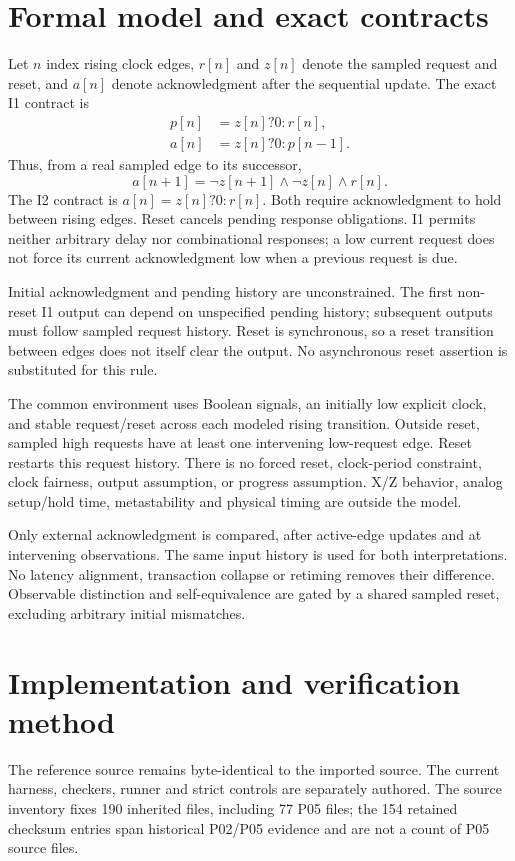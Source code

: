 \documentclass[11pt,a4paper]{article}
\begin{document}
\section{Formal model and exact contracts}
Let $n$ index rising clock edges, $r[n]$ and $z[n]$ denote the sampled request and reset, and $a[n]$ denote acknowledgment after the sequential update. The exact I1 contract is
\begin{align}
p[n]&=z[n] ? 0 : r[n],\\
a[n]&=z[n] ? 0 : p[n-1].
\end{align}
Thus, from a real sampled edge to its successor,
\begin{equation}
a[n+1]=\neg z[n+1]\land\neg z[n]\land r[n].
\end{equation}
The I2 contract is $a[n]=z[n] ? 0 : r[n]$. Both require acknowledgment to hold between rising edges. Reset cancels pending response obligations. I1 permits neither arbitrary delay nor combinational responses; a low current request does not force its current acknowledgment low when a previous request is due.

Initial acknowledgment and pending history are unconstrained. The first non-reset I1 output can depend on unspecified pending history; subsequent outputs must follow sampled request history. Reset is synchronous, so a reset transition between edges does not itself clear the output. No asynchronous reset assertion is substituted for this rule.

The common environment uses Boolean signals, an initially low explicit clock, and stable request/reset across each modeled rising transition. Outside reset, sampled high requests have at least one intervening low-request edge. Reset restarts this request history. There is no forced reset, clock-period constraint, clock fairness, output assumption, or progress assumption. X/Z behavior, analog setup/hold time, metastability and physical timing are outside the model.

Only external acknowledgment is compared, after active-edge updates and at intervening observations. The same input history is used for both interpretations. No latency alignment, transaction collapse or retiming removes their difference. Observable distinction and self-equivalence are gated by a shared sampled reset, excluding arbitrary initial mismatches.

\section{Implementation and verification method}
The reference source remains byte-identical to the imported source. The current harness, checkers, runner and strict controls are separately authored. The source inventory fixes 190 inherited files, including 77 P05 files; the 154 retained checksum entries span historical P02/P05 evidence and are not a count of P05 source files.
\end{document}
